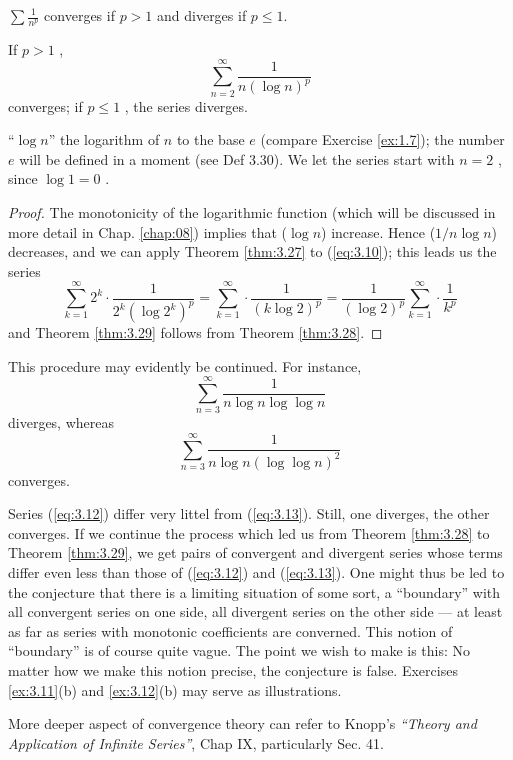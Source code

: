 \begin{thm}
    \label{thm:3.28}
    $\sum \frac{1}{n^p}$ converges if $p>1$ and diverges if $p\leq 1$.
\end{thm}

\begin{thm}
    \label{thm:3.29}
    If $p > 1$ ,
    \begin{equation}
        \label{eq:3.10}
        \sum_{n=2}^{\infty} \frac{1}{n (\log n)^p}
    \end{equation}
    converges; if $p \leq 1$ , the series diverges.
\end{thm}

``$\log n$'' the logarithm of $n$ to the base $e$ (compare Exercise \ref{ex:1.7});
the number $e$ will be defined in a moment (see Def 3.30). We let the series start with $n=2$ , since $\log 1 = 0$ .

\begin{proof}
    The monotonicity of the logarithmic function (which will be discussed in more detail in Chap. \ref{chap:08}) implies that ($\log n$) increase. Hence ($1/n \log n$) decreases, and we can apply Theorem \ref{thm:3.27} to (\ref{eq:3.10}); this leads us the series
    \begin{equation}
        \label{eq:3.11}
        \sum_{k=1}^{\infty}2^k\cdot\frac{1}{2^k (\log 2^k)^p} =
        \sum_{k=1}^{\infty}\cdot\frac{1}{(k\log 2)^p} =
        \frac{1}{(\log 2)^p}\sum_{k=1}^{\infty}\cdot\frac{1}{k^p}
    \end{equation}
    and Theorem \ref{thm:3.29} follows from Theorem \ref{thm:3.28}.
\end{proof}


This procedure may evidently be continued. For instance,
\begin{equation}
    \label{eq:3.12}
    \sum_{n=3}^{\infty}\frac{1}{n \log n \log \log n}
\end{equation}
diverges, whereas
\begin{equation}
    \label{eq:3.13}
    \sum_{n=3}^{\infty}\frac{1}{n \log n (\log \log n)^2}
\end{equation}
converges.

Series (\ref{eq:3.12}) differ very littel from (\ref{eq:3.13}). Still, one diverges, the other converges.
If we continue the process which led us from Theorem \ref{thm:3.28} to Theorem \ref{thm:3.29}, we get pairs of convergent and divergent series whose terms differ even less than those of (\ref{eq:3.12}) and (\ref{eq:3.13}).
One might thus be led to the conjecture that there is a limiting situation of some sort, a ``boundary'' with all convergent series on one side, all divergent series on the other side --- at least as far as series with monotonic coefficients are converned.
This notion of ``boundary'' is of course quite vague.
The point we wish to make is this: No matter how we make this notion precise, the conjecture is false. Exercises \ref{ex:3.11}(b) and \ref{ex:3.12}(b) may serve as illustrations.

More deeper aspect of convergence theory can refer to Knopp's\cite{KNOPP1928} \emph{``Theory and Application of Infinite Series''}, Chap IX, particularly Sec. 41.
